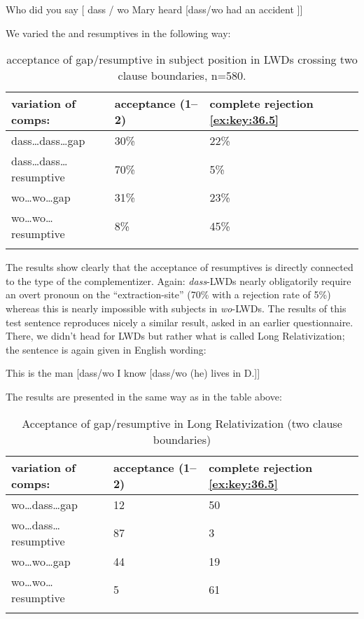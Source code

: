 \documentclass[output=paper]{langsci/langscibook}
\begin{document}
\ea\label{ex:key:36.14}
    Who did you say [ dass / wo Mary heard [dass/wo \underline{\hphantom{2em}} had an accident ]]
\z

We varied the  and resumptives in the following way:

\begin{table}
\begin{tabularx}{\textwidth}{XXX}
\lsptoprule
{variation of comps:} & {acceptance (1--2)} & {complete rejection \eqref{ex:key:36.5}}\\
\midrule
{dass\dots{}dass\dots{}gap} & {30\%} & {22\%}\\
{dass\dots{}dass\dots{}resumptive} & {70\%} & {5\%}\\
{wo\dots{}wo\dots{}gap} & {31\%} & {23\%}\\
{wo\dots{}wo\dots{}resumptive} & {8\%} & {45\%}\\
\lspbottomrule
\end{tabularx}
\caption{acceptance of gap/resumptive in subject position in \glspl{LWD} crossing two
clause boundaries, n=580.}\label{tab:key:36.2}
\end{table}

The results show clearly that the acceptance of resumptives is directly
connected to the type of the complementizer. Again: \emph{dass}-\glspl{LWD} nearly
obligatorily require an overt pronoun on the \enquote{extraction-site} (70\% with a
rejection rate of 5\%) whereas this is nearly impossible with subjects in
\emph{wo}-\glspl{LWD}. The results of this test sentence reproduces nicely a similar
result, asked in an earlier questionnaire. There, we didn’t head for \glspl{LWD} but
rather what is called Long Relativization; the sentence is again given in
English wording:

\ea
	 This is the man [dass/wo I know [dass/wo (he) lives in D.]]
\z

The results are presented in the same way as in the table above:

\begin{table}
\begin{tabularx}{\textwidth}{XXX}
\lsptoprule
{variation of comps:} & {acceptance (1--2)} & {complete rejection \eqref{ex:key:36.5}}\\
\midrule
{wo\dots{}dass\dots{}gap} & {12} & {50}\\
{wo\dots{}dass\dots{}resumptive} & {87} & {3}\\
{wo\dots{}wo\dots{}gap} & {44} & {19}\\
{wo\dots{}wo\dots{}resumptive} & {5} & {61}\\
\lspbottomrule
\end{tabularx}
\caption{Acceptance of gap/resumptive in Long Relativization (two clause
boundaries)}\label{tab:key:36.3}
\end{table}
\end{document}
